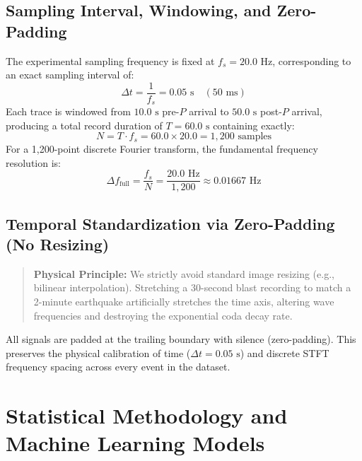 \documentclass[11pt,a4paper]{article}
\begin{document}
\subsection{Sampling Interval, Windowing, and Zero-Padding}
The experimental sampling frequency is fixed at $f_s = 20.0\text{ Hz}$, corresponding to an exact sampling interval of:
\begin{equation*}
    \Delta t = \frac{1}{f_s} = 0.05\text{ s} \quad (50\text{ ms})
\end{equation*}
Each trace is windowed from $10.0\text{ s}$ pre-$P$ arrival to $50.0\text{ s}$ post-$P$ arrival, producing a total record duration of $T = 60.0\text{ s}$ containing exactly:
\begin{equation*}
    N = T \cdot f_s = 60.0 \times 20.0 = 1,200\text{ samples}
\end{equation*}
For a 1,200-point discrete Fourier transform, the fundamental frequency resolution is:
\begin{equation*}
    \Delta f_{\text{full}} = \frac{f_s}{N} = \frac{20.0\text{ Hz}}{1,200} \approx 0.01667\text{ Hz}
\end{equation*}

\subsection{Temporal Standardization via Zero-Padding (No Resizing)}
\begin{quote}
\textbf{Physical Principle:} We strictly avoid standard image resizing (e.g., bilinear interpolation). Stretching a 30-second blast recording to match a 2-minute earthquake artificially stretches the time axis, altering wave frequencies and destroying the exponential coda decay rate.
\end{quote}
All signals are padded at the trailing boundary with silence (zero-padding). This preserves the physical calibration of time ($\Delta t = 0.05\text{ s}$) and discrete STFT frequency spacing across every event in the dataset.


\section{Statistical Methodology and Machine Learning Models}
\end{document}
